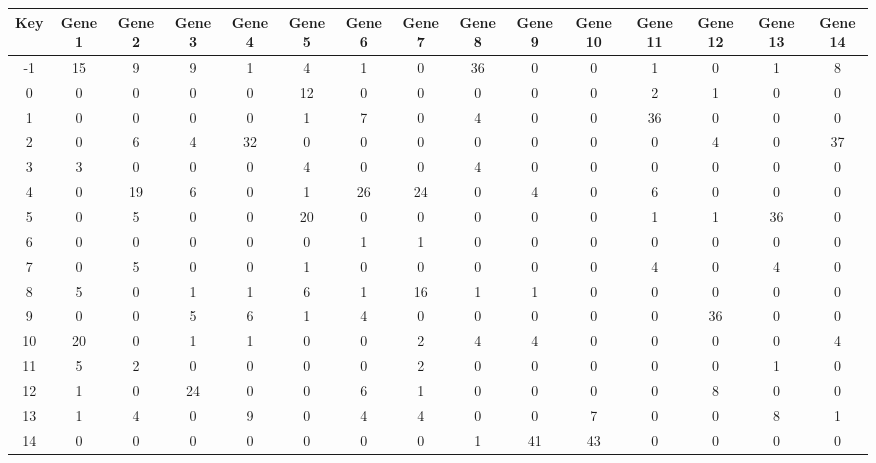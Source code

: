 \begin{tabular}{|c|c|c|c|c|c|c|c|c|c|c|c|c|c|c|}
\hline
Key & Gene 1 & Gene 2 & Gene 3 & Gene 4 & Gene 5 & Gene 6 & Gene 7 & Gene 8 & Gene 9 & Gene 10 & Gene 11 & Gene 12 & Gene 13 & Gene 14 \\
\hline
-1 & 15 & 9 & 9 & 1 & 4 & 1 & 0 & 36 & 0 & 0 & 1 & 0 & 1 & 8 \\
0 & 0 & 0 & 0 & 0 & 12 & 0 & 0 & 0 & 0 & 0 & 2 & 1 & 0 & 0 \\
1 & 0 & 0 & 0 & 0 & 1 & 7 & 0 & 4 & 0 & 0 & 36 & 0 & 0 & 0 \\
2 & 0 & 6 & 4 & 32 & 0 & 0 & 0 & 0 & 0 & 0 & 0 & 4 & 0 & 37 \\
3 & 3 & 0 & 0 & 0 & 4 & 0 & 0 & 4 & 0 & 0 & 0 & 0 & 0 & 0 \\
4 & 0 & 19 & 6 & 0 & 1 & 26 & 24 & 0 & 4 & 0 & 6 & 0 & 0 & 0 \\
5 & 0 & 5 & 0 & 0 & 20 & 0 & 0 & 0 & 0 & 0 & 1 & 1 & 36 & 0 \\
6 & 0 & 0 & 0 & 0 & 0 & 1 & 1 & 0 & 0 & 0 & 0 & 0 & 0 & 0 \\
7 & 0 & 5 & 0 & 0 & 1 & 0 & 0 & 0 & 0 & 0 & 4 & 0 & 4 & 0 \\
8 & 5 & 0 & 1 & 1 & 6 & 1 & 16 & 1 & 1 & 0 & 0 & 0 & 0 & 0 \\
9 & 0 & 0 & 5 & 6 & 1 & 4 & 0 & 0 & 0 & 0 & 0 & 36 & 0 & 0 \\
10 & 20 & 0 & 1 & 1 & 0 & 0 & 2 & 4 & 4 & 0 & 0 & 0 & 0 & 4 \\
11 & 5 & 2 & 0 & 0 & 0 & 0 & 2 & 0 & 0 & 0 & 0 & 0 & 1 & 0 \\
12 & 1 & 0 & 24 & 0 & 0 & 6 & 1 & 0 & 0 & 0 & 0 & 8 & 0 & 0 \\
13 & 1 & 4 & 0 & 9 & 0 & 4 & 4 & 0 & 0 & 7 & 0 & 0 & 8 & 1 \\
14 & 0 & 0 & 0 & 0 & 0 & 0 & 0 & 1 & 41 & 43 & 0 & 0 & 0 & 0 \\
\hline
\end{tabular}